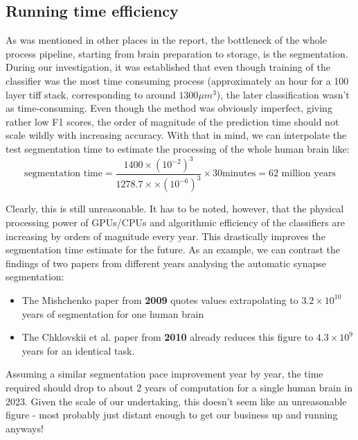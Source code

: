 \documentclass[a4paper, 11pt]{article}
\numberwithin{equation}{section}
\begin{document}
		\subsection{Running time efficiency}
		As was mentioned in other places in the report, the bottleneck of the whole process pipeline, starting from brain preparation to storage, is the segmentation. During our investigation, it was established that even though training of the classifier was the most time consuming process (approximately an hour for a 100 layer tiff stack, corresponding to around $1300 \mu m^3$), the later classification wasn't as time-consuming. Even though the method was obviously imperfect, giving rather low F1 scores, the order of magnitude of the prediction time should not scale wildly with increasing accuracy. With that in mind, we can interpolate the test segmentation time to estimate the processing of the whole human brain like:
		\begin{equation} \label{segmtime}
		\textrm{segmentation time} = \frac{1400 \times (10^{-2})^3}{1278.7\times  \times (10^{-6})^3} \times 30 \textrm{minutes} = \textrm{62 million years}
		\end{equation}
		
		\noindent Clearly, this is still unreasonable. It has to be noted, however, that the physical processing power of GPUs/CPUs and algorithmic efficiency of the classifiers are increasing by orders of magnitude every year. This drastically improves the segmentation time estimate for the future. As an example, we can contrast the findings of two papers from different years analysing the automatic synapse segmentation:
		
		\begin{itemize}
			\item The Mishchenko paper from \textbf{2009} \cite{mishchenko2009automation} quotes values extrapolating to \boldmath$3.2 \times 10^{10}$ years of segmentation for one human brain
			\item The Chklovskii et al. paper from \textbf{2010} \cite{chklovskii2010semi} already reduces this figure to $4.3 \times 10^9$ years for an identical task.
		\end{itemize}
		
		\noindent Assuming a similar segmentation pace improvement year by year, the time required should drop to about 2 years of computation for a single human brain in 2023. Given the scale of our undertaking, this doesn't seem like an unreasonable figure - most probably just distant enough to get our business up and running anyways!
		
\end{document}
